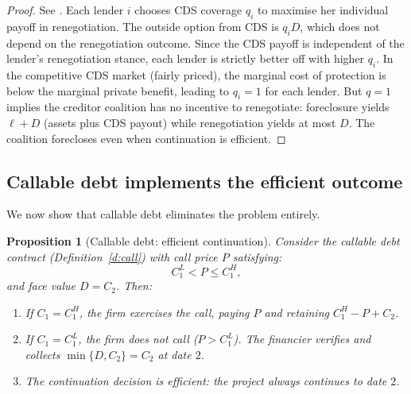 \documentclass[12pt,a4paper]{article}
\theoremstyle{plain}
\newtheorem{proposition}[theorem]{Proposition}
\theoremstyle{definition}
\theoremstyle{remark}
\begin{document}
\begin{proof}
See \citet[Proposition~4]{boltonoehmke2011}. Each lender $i$ chooses CDS coverage $q_i$ to maximise her individual payoff in renegotiation. The outside option from CDS is $q_i D$, which does not depend on the renegotiation outcome. Since the CDS payoff is independent of the lender's renegotiation stance, each lender is strictly better off with higher $q_i$. In the competitive CDS market (fairly priced), the marginal cost of protection is below the marginal private benefit, leading to $q_i = 1$ for each lender. But $q = 1$ implies the creditor coalition has no incentive to renegotiate: foreclosure yields $\ell + D$ (assets plus CDS payout) while renegotiation yields at most $D$. The coalition forecloses even when continuation is efficient.
\end{proof}

\subsection{Callable debt implements the efficient outcome}

We now show that callable debt eliminates the problem entirely.

\begin{proposition}[Callable debt: efficient continuation]\label{p:call}
Consider the callable debt contract (Definition~\ref{d:call}) with call price $P$ satisfying:
\begin{equation}\label{eq:callprice}
C_1^L < P \leq C_1^H,
\end{equation}
and face value $D = C_2$. Then:
\begin{enumerate}[nosep,label=(\alph*)]
\item If $C_1 = C_1^H$, the firm exercises the call, paying $P$ and retaining $C_1^H - P + C_2$.
\item If $C_1 = C_1^L$, the firm does not call ($P > C_1^L$). The financier verifies and collects $\min\{D, C_2\} = C_2$ at date $2$.
\item The continuation decision is efficient: the project always continues to date $2$.
\end{enumerate}
\end{proposition}
\end{document}
